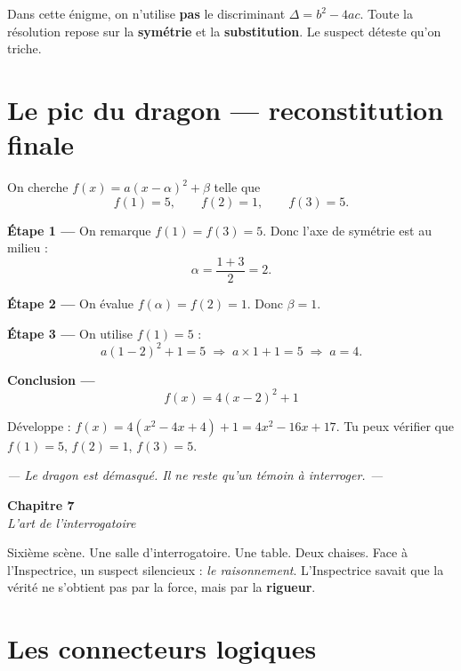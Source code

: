 \documentclass[11pt,a4paper]{article}
\newcommand{\chapterheader}[2]{%
  \clearpage
  \begin{tcolorbox}[
    enhanced,
    colback=ink, colframe=ink,
    interior style={top color=ink, bottom color=charcoal, shading angle=90},
    boxrule=0pt, arc=0pt,
    left=18pt, right=18pt, top=14pt, bottom=14pt,
    width=\textwidth,
  ]
    {\color{white}\Huge\bfseries #1}\\[6pt]
    {\color{silver}\large\itshape #2}
  \end{tcolorbox}
  \vspace{6pt}
}
\begin{document}
\begin{alerte}
Dans cette énigme, on n'utilise \textbf{pas} le discriminant $\Delta = b^2 - 4ac$. Toute la résolution repose sur la \textbf{symétrie} et la \textbf{substitution}. Le suspect déteste qu'on triche.
\end{alerte}

\section{Le pic du dragon — reconstitution finale}

\begin{rapport}
On cherche $f(x) = a(x-\alpha)^2 + \beta$ telle que
\[
  f(1) = 5, \qquad f(2) = 1, \qquad f(3) = 5.
\]

\textbf{Étape 1 —} On remarque $f(1) = f(3) = 5$. Donc l'axe de symétrie est au milieu :
\[
  \alpha = \frac{1+3}{2} = 2.
\]

\textbf{Étape 2 —} On évalue $f(\alpha) = f(2) = 1$. Donc $\beta = 1$.

\textbf{Étape 3 —} On utilise $f(1) = 5$ :
\[
  a(1-2)^2 + 1 = 5 \;\Longrightarrow\; a \times 1 + 1 = 5 \;\Longrightarrow\; a = 4.
\]

\textbf{Conclusion —}
\[
  \boxed{\,f(x) = 4(x-2)^2 + 1\,}
\]
\end{rapport}

\begin{methode}[Vérification]
Développe : $f(x) = 4(x^2 - 4x + 4) + 1 = 4x^2 - 16x + 17$. Tu peux vérifier que $f(1) = 5$, $f(2) = 1$, $f(3) = 5$.
\end{methode}

\vfill
\begin{center}
\textcolor{slate}{\itshape\small — Le dragon est démasqué. Il ne reste qu'un témoin à interroger. —}
\end{center}

\chapterheader{Chapitre 7}{L'art de l'interrogatoire}

Sixième scène. Une salle d'interrogatoire. Une table. Deux chaises. Face à l'Inspectrice, un suspect silencieux : \emph{le raisonnement}. L'Inspectrice savait que la vérité ne s'obtient pas par la force, mais par la \textbf{rigueur}.

\section{Les connecteurs logiques}
\end{document}
